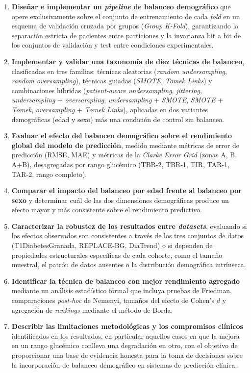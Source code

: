 \begin{enumerate}

    \item \textbf{Diseñar e implementar un \emph{pipeline} de balanceo demográfico} que opere exclusivamente sobre el conjunto de entrenamiento de cada \emph{fold} en un esquema de validación cruzada por grupos (\emph{Group K-Fold}), garantizando la separación estricta de pacientes entre particiones y la invarianza bit a bit de los conjuntos de validación y test entre condiciones experimentales.

    \item \textbf{Implementar y validar una taxonomía de diez técnicas de balanceo}, clasificadas en tres familias: técnicas aleatorias (\emph{random undersampling}, \emph{random oversampling}), técnicas guiadas (\emph{SMOTE}, \emph{Tomek Links}) y combinaciones híbridas (\emph{patient-aware undersampling}, \emph{jittering}, \emph{undersampling} + \emph{oversampling}, \emph{undersampling} + \emph{SMOTE}, \emph{SMOTE} + \emph{Tomek}, \emph{oversampling} + \emph{Tomek Links}), aplicadas en dos variantes demográficas (edad y sexo) más una condición de control sin balanceo.

    \item \textbf{Evaluar el efecto del balanceo demográfico sobre el rendimiento global del modelo de predicción}, medido mediante métricas de error de predicción (RMSE, MAE) y métricas de la \emph{Clarke Error Grid} (zonas A, B, A+B), desagregadas por rango glucémico (TBR-2, TBR-1, TIR, TAR-1, TAR-2, rango completo).

    \item \textbf{Comparar el impacto del balanceo por edad frente al balanceo por sexo} y determinar cuál de las dos dimensiones demográficas produce un efecto mayor y más consistente sobre el rendimiento predictivo.

    \item \textbf{Caracterizar la robustez de los resultados entre \emph{datasets}}, evaluando si los efectos observados son consistentes a través de los tres conjuntos de datos (T1DiabetesGranada, REPLACE-BG, DiaTrend) o si dependen de propiedades estructurales específicas de cada cohorte, como el tamaño muestral, el patrón de datos ausentes o la distribución demográfica intrínseca.

    \item \textbf{Identificar la técnica de balanceo con mejor rendimiento agregado} mediante un análisis estadístico formal que incluya pruebas de Friedman, comparaciones \emph{post-hoc} de Nemenyi, tamaños del efecto de Cohen's $d$ y agregación de \emph{rankings} mediante el método de Borda.

    \item \textbf{Describir las limitaciones metodológicas y los compromisos clínicos} identificados en los resultados, en particular aquellos casos en que la mejora en un rango glucémico conlleva una degradación en otro, con el objetivo de proporcionar una base de evidencia honesta para la toma de decisiones sobre la incorporación de balanceo demográfico en sistemas de predicción clínica.

\end{enumerate}

